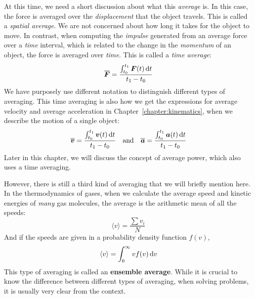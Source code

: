 \begin{remark}
  At this time, we need a short discussion about what this \emph{average} is.
  In this case, the force is averaged over the \emph{displacement} that the
  object travels. This is called a \emph{spatial average}. We are not concerned
  about how long it takes for the object to move. In contrast, when computing
  the \emph{impulse} generated from an average force over a \emph{time}
  interval, which is related to the change in the \emph{momentum} of an object,
  the force is averaged over \emph{time}. This is called a \emph{time average}:
  \begin{displaymath}
    \overline{\bm F}=\frac{\int_{t_0}^{t_1} \bm F(t)\dl t}{t_1-t_0}
  \end{displaymath}
  We have purposely use different notation to distinguish different types of
  averaging.
  This time averaging is also how we get the expressions for average velocity
  and average acceleration in Chapter~\ref{chapter:kinematics}, when we
  describe the motion of a single object:
  \begin{displaymath}
    \overline{\bm v}=\frac{\int_{t_0}^{t_1} \bm v(t)\dl t}{t_1-t_0}
    \quad\text{and}\quad
    \overline{\bm a}=\frac{\int_{t_0}^{t_1} \bm a(t)\dl t}{t_1-t_0}
  \end{displaymath}
  Later in this chapter, we will discuss the concept of average power, which
  also uses a time averaging.

  However, there is still a third kind of averaging that we will briefly
  mention here. In the thermodynamics of gases, when we calculate the average
  speed and kinetic energies of \emph{many} gas molecules, the average is the
  arithmetic mean of all the speeds:
  \begin{displaymath}
    \langle v\rangle = \frac{\sum v_i}N
  \end{displaymath}
  And if the speeds are given in a probability density function $f(v)$,
  \begin{displaymath}
    \langle v\rangle = \int_0^\infty vf(v)\dl v
  \end{displaymath}
  This type of averaging is called an \textbf{ensemble average}. While it is
  crucial to know the difference between different types of averaging, when
  solving problems, it is usually very clear from the context. 
\end{remark}

